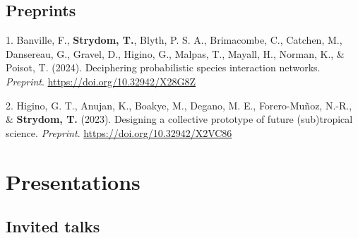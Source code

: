 \documentclass[11pt,a4paper,]{awesome-cv}
\newlength{\cslhangindent}
\newenvironment{CSLReferences}[2] %
 {\begin{list}{}{%
  \setlength{\itemindent}{0pt}
  \setlength{\leftmargin}{0pt}
  \setlength{\parsep}{0pt}
  \ifodd #1
   \setlength{\leftmargin}{\cslhangindent}
   \setlength{\itemindent}{-1\cslhangindent}
  \fi
  \setlength{\itemsep}{#2\baselineskip}}}
 {\end{list}}
\begin{document}
\vspace{\baselineskip}

\subsection{\texorpdfstring{\textbf{Preprints}}{Preprints}}\label{preprints}

\label{refs-46e27930645a576b6b997246c92e1ddc}
\begin{CSLReferences}{1}{0}
1. Banville, F., \textbf{Strydom, T.}, Blyth, P. S. A., Brimacombe, C.,
Catchen, M., Dansereau, G., Gravel, D., Higino, G., Malpas, T., Mayall,
H., Norman, K., \& Poisot, T. (2024). Deciphering probabilistic species
interaction networks. \emph{Preprint}.
\url{https://doi.org/10.32942/X28G8Z}

2. Higino, G. T., Anujan, K., Boakye, M., Degano, M. E., Forero-Muñoz,
N.-R., \& \textbf{Strydom, T.} (2023). Designing a collective prototype
of future (sub)tropical science. \emph{Preprint}.
\url{https://doi.org/10.32942/X2VC86}

\end{CSLReferences}

\section{\texorpdfstring{
Presentations}{ Presentations}}\label{presentations}

\vspace{\baselineskip}

\subsection{\texorpdfstring{\textbf{Invited
talks}}{Invited talks}}\label{invited-talks}

\begin{cventries}
    \vspace{-4.0mm}
    \vspace{-4.0mm}
    \vspace{-4.0mm}
\end{cventries}
\vspace{\baselineskip}
\end{document}
